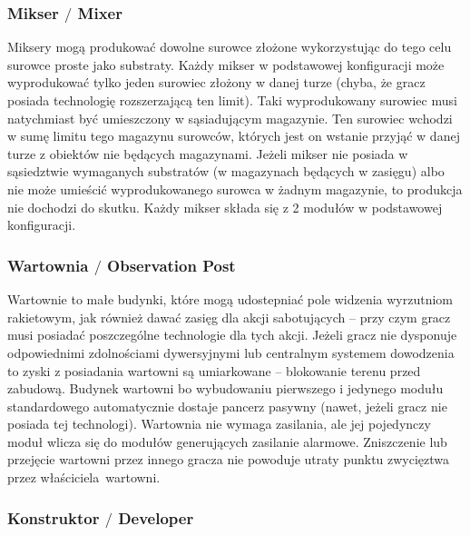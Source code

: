 \documentclass[11pt,a4paper]{article}
\begin{document}
\subsubsection{Mikser $/$ Mixer}

Miksery mogą produkować dowolne surowce złożone wykorzystując do tego celu surowce proste jako substraty. Każdy mikser w podstawowej konfiguracji może wyprodukować tylko jeden surowiec złożony w danej turze (chyba, że gracz posiada technologię rozszerzającą ten limit). Taki wyprodukowany surowiec musi natychmiast być umieszczony w sąsiadującym magazynie. Ten surowiec wchodzi w sumę limitu tego magazynu surowców, których jest on wstanie przyjąć w danej turze z obiektów nie będących magazynami. Jeżeli mikser nie posiada w sąsiedztwie wymaganych substratów (w magazynach będących w zasięgu) albo nie może umieścić wyprodukowanego surowca w żadnym magazynie, to produkcja nie dochodzi do skutku. Każdy mikser składa się z 2 modułów w podstawowej konfiguracji.

\subsubsection{Wartownia $/$ Observation Post}

Wartownie to małe budynki, które mogą udostepniać pole widzenia wyrzutniom rakietowym, jak również dawać zasięg dla akcji sabotujących -- przy czym gracz musi posiadać poszczególne technologie dla tych akcji. Jeżeli gracz nie dysponuje odpowiednimi zdolnościami dywersyjnymi lub centralnym systemem dowodzenia to zyski z posiadania wartowni są umiarkowane -- blokowanie terenu przed zabudową. Budynek wartowni bo wybudowaniu pierwszego i jedynego modułu standardowego automatycznie dostaje pancerz pasywny (nawet, jeżeli gracz nie posiada tej technologi). Wartownia nie wymaga zasilania, ale jej pojedynczy moduł wlicza się do modułów generujących zasilanie alarmowe. Zniszczenie lub przejęcie wartowni przez innego gracza nie powoduje utraty punktu zwycięztwa przez właściciela~wartowni.

\subsubsection{Konstruktor $/$ Developer}
\end{document}
